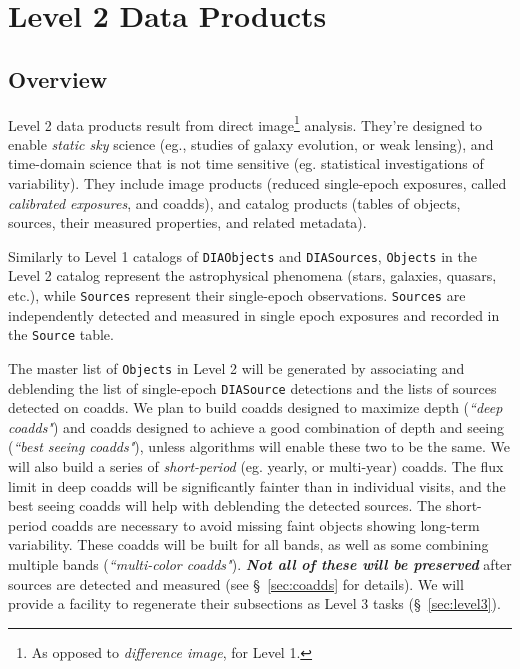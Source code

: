 \documentclass[12pt]{article}
\newcommand{\code}[1]{\texttt{#1}}
\newcommand{\DIASource}{\code{DIASource}\xspace}
\newcommand{\DIASources}{\code{DIASources}\xspace}
\newcommand{\DIAObjects}{\code{DIAObjects}\xspace}
\newcommand{\Objects}{\code{Objects}\xspace}
\newcommand{\Source}{\code{Source}\xspace}
\newcommand{\Sources}{\code{Sources}\xspace}
\begin{document}
\clearpage

\section{Level 2 Data Products}
\label{sec:level2}

\subsection{Overview}

Level 2 data products result from direct image\footnote{As opposed to {\em difference image}, for Level 1.} analysis. They're designed to enable {\em static sky} science (eg., studies of galaxy evolution, or weak lensing), and time-domain science that is not time sensitive (eg. statistical investigations of variability). They include image products (reduced single-epoch exposures, called {\em calibrated exposures}, and coadds), and catalog products (tables of objects, sources, their measured properties, and related metadata).

\vspace{1em}

Similarly to Level 1 catalogs of \DIAObjects and \DIASources, \Objects in the Level 2 catalog represent the astrophysical phenomena (stars, galaxies, quasars, etc.), while \Sources represent their single-epoch observations. \Sources are independently detected and measured in single epoch exposures and recorded in the \Source table.

The master list of \Objects in Level 2 will be generated by associating and deblending the list of single-epoch \DIASource detections and the lists of sources detected on coadds. We plan to build coadds designed to maximize depth ({\em ``deep coadds"}) and coadds designed to achieve a good combination of depth and seeing ({\em ``best seeing coadds"}), unless
algorithms will enable these two to be the same. We will also build a series of {\em short-period} (eg. yearly, or multi-year) coadds. The flux limit in deep coadds will be significantly fainter than in individual visits, and the best seeing coadds will help with deblending the detected sources. The short-period coadds are necessary to avoid missing faint objects showing long-term variability. These coadds will be built for all bands, as well as some combining multiple bands ({\em ``multi-color coadds"}). {\bf \em Not all of these will be preserved} after sources are detected and measured (see \S~\ref{sec:coadds} for details). We will provide a facility to regenerate their subsections as Level 3 tasks (\S~\ref{sec:level3}).
\end{document}
